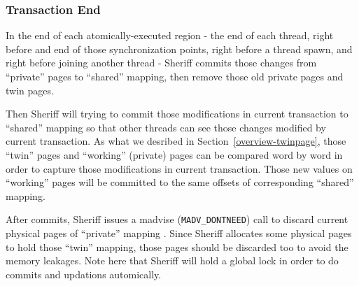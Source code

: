 \subsubsection{Transaction End}
\label{simulation:endtran}
In the end of each atomically-executed region - the end of each thread, right before and end of those synchronization points, 
right before a thread spawn, and right before joining another thread - 
Sheriff commits those changes from ``private'' pages to ``shared'' mapping, 
then remove those old private pages and twin pages.

Then Sheriff will trying to commit those modifications in current transaction to ``shared'' mapping so that other threads can
see those changes modified by current transaction. 
As what we desribed in Section~\ref{overview-twinpage}, those ``twin'' pages and ``working'' (private) pages
can be compared word by word in order to capture those modifications in current transaction. 
Those new values on ``working'' pages will be committed to the same offsets of corresponding ``shared'' mapping.

After commits, Sheriff issues a madvise (\texttt{MADV\_DONTNEED}) call to discard current physical pages of ``private'' mapping 
. Since Sheriff allocates some physical pages to 
hold those ``twin'' mapping, those pages should be discarded too to avoid the memory leakages. 
Note here that Sheriff will hold a global lock in order to do commits and updations automically. 
\begin{comment}
\begin{figure}[!t]
\small 
\begin{lstlisting}[frame=trbl]{}
//@This function is called by pthread_join
void uniqueChecking (void) {
  // Is it the initial thread?
  if(getpid() == initialPid) {
	// Using waitpid to check the uniqueness.
    if(waitpid(-1, NULL, WNOHANG) == -1 
	   && errno == ECHILD) {
		// Close protetion here.
        closeMemoryProtection();
        _protected = false;
    }
  }
}
\end{lstlisting}
\caption{Pseudo-code for unique checking.\label{fig:unique}}
\end{figure}

\end{comment}
